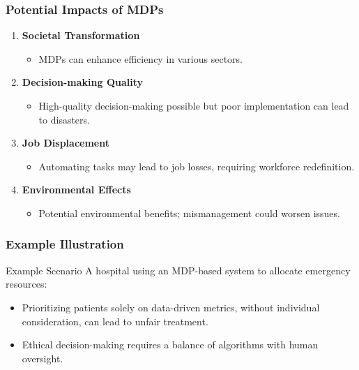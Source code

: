 \documentclass{beamer}
\begin{document}
\begin{frame}[fragile]
    \frametitle{Potential Impacts of MDPs}
    \begin{enumerate}
        \item \textbf{Societal Transformation}
            \begin{itemize}
                \item MDPs can enhance efficiency in various sectors.
            \end{itemize}

        \item \textbf{Decision-making Quality}
            \begin{itemize}
                \item High-quality decision-making possible but poor implementation can lead to disasters.
            \end{itemize}

        \item \textbf{Job Displacement}
            \begin{itemize}
                \item Automating tasks may lead to job losses, requiring workforce redefinition.
            \end{itemize}

        \item \textbf{Environmental Effects}
            \begin{itemize}
                \item Potential environmental benefits; mismanagement could worsen issues.
            \end{itemize}
    \end{enumerate}
\end{frame}

\begin{frame}[fragile]
    \frametitle{Example Illustration}
    \begin{block}{Example Scenario}
        A hospital using an MDP-based system to allocate emergency resources:
        \begin{itemize}
            \item Prioritizing patients solely on data-driven metrics, without individual consideration, can lead to unfair treatment.
            \item Ethical decision-making requires a balance of algorithms with human oversight.
        \end{itemize}
    \end{block}
\end{frame}
\end{document}
